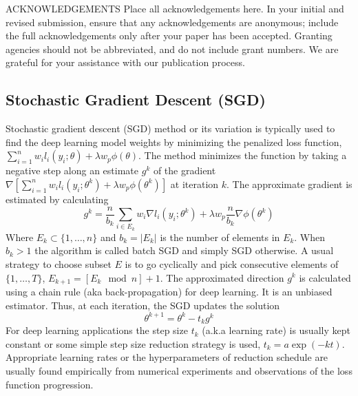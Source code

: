\documentclass[12pt]{TD-CJS}
\begin{document}
\begin{ack}{ACKNOWLEDGEMENTS}
Place all acknowledgements here.  In your initial and revised submission, ensure that any acknowledgements are anonymous; include the full acknowledgements only after your paper has been accepted. Granting agencies should not be abbreviated, and do not include grant numbers.  We are grateful for your assistance with our publication process.\\
\end{ack}


%

\begin{appendix}
\section{Stochastic Gradient Descent (SGD) \label{SGD}}
Stochastic gradient descent (SGD) method or its variation  is typically used to find the deep learning model weights by minimizing the penalized loss function, $\sum_{i=1}^n w_i l_i(y_i; \theta) + \lambda w_{p} \phi(\theta)$. The method minimizes the function by taking a negative step along an estimate $g^k$ of the gradient $\nabla\left[\sum_{i=1}^n w_i l_i(y_i; \theta^k) + \lambda w_{p} \phi(\theta^k)\right] $ at iteration $k$. 
The approximate gradient is estimated by calculating 
\[
g^k = \frac{n}{b_k} \sum_{i \in E_k} w_i\nabla  l_i(y_i; \theta^k) +  \lambda w_{p} \frac{n}{b_k}\nabla \phi(\theta^k)
\]
Where $E_k \subset \{1,\ldots,n \}$ and $b_k = |E_k|$ is the number of elements in $E_k$. When $b_k >1$ the algorithm is called batch SGD and simply SGD otherwise. A usual strategy to choose subset $E$ is to go cyclically and pick consecutive elements of $\{1,\ldots,T \}$, $E_{k+1} = [E_k \mod n]+1$. The approximated direction  $g^k$ is calculated using a chain rule (aka back-propagation) for deep learning. It  is an unbiased estimator. Thus, at each iteration, the SGD updates the solution
\[
\theta^{k+1} = \theta^k - t_k g^k
\]
For deep learning applications the step size $t_k$ (a.k.a learning rate) is usually kept constant or some simple step size reduction strategy is used, $t_k = a\exp(-kt)$. Appropriate learning rates or the hyperparameters of reduction schedule  are usually found empirically from numerical experiments and observations of the loss function progression. \\
\end{appendix}

\CJShistory
\end{document}
